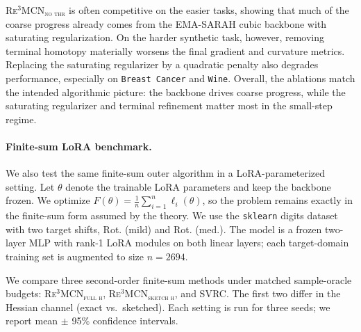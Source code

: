 \documentclass{article}
\theoremstyle{plain}
\theoremstyle{definition}
\theoremstyle{remark}
\begin{document}
\textsc{Re$^3$MCN$_{\text{no thr}}$} is often competitive on the easier tasks, showing that much of the coarse progress already comes from the EMA-SARAH cubic backbone with saturating regularization. On the harder synthetic task, however, removing terminal homotopy materially worsens the final gradient and curvature metrics. Replacing the saturating regularizer by a quadratic penalty also degrades performance, especially on \texttt{Breast Cancer} and \texttt{Wine}. Overall, the ablations match the intended algorithmic picture: the backbone drives coarse progress, while the saturating regularizer and terminal refinement matter most in the small-step regime.

\paragraph{Finite-sum LoRA benchmark.}
We also test the same finite-sum outer algorithm in a LoRA-parameterized setting. Let $\theta$ denote the trainable LoRA parameters and keep the backbone frozen. We optimize $F(\theta)=\frac{1}{n}\sum_{i=1}^n \ell_i(\theta)$,
so the problem remains exactly in the finite-sum form assumed by the theory. We use the \texttt{sklearn} digits dataset with two target shifts, {Rot. (mild)} and {Rot. (med.)}. The model is a frozen two-layer MLP with rank-1 LoRA modules on both linear layers; each target-domain training set is augmented to size $n=2694$.

We compare three second-order finite-sum methods under matched sample-oracle budgets: \textsc{Re$^3$MCN$_{\text{full h}}$}, \textsc{Re$^3$MCN$_{\text{sketch h}}$}, and \textsc{SVRC}. The first two differ in the Hessian channel (exact vs.~sketched). Each setting is run for three seeds; we report mean $\pm$ 95\% confidence intervals.
\end{document}
